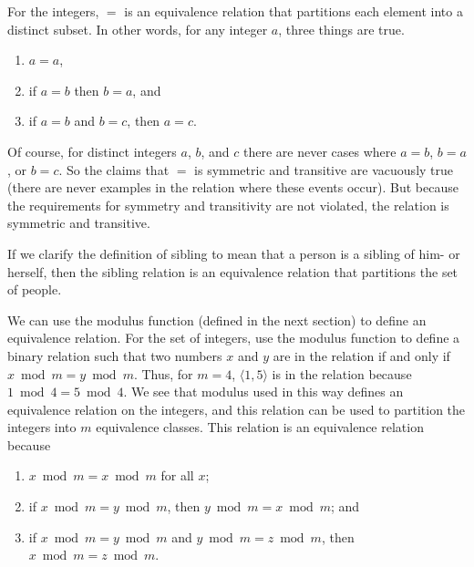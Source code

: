 \begin{example}
For the integers, \(=\) is an equivalence relation that partitions
each element into a distinct subset.
In other words, for any integer \(a\), three things are true.
\begin{enumerate}
\item \(a = a\),
\item if \(a = b\) then \(b = a\), and
\item if \(a = b\) and \(b = c\), then \(a = c\).
\end{enumerate}

Of course, for distinct integers \(a\), \(b\), and \(c\) there are
never cases where \(a = b\), \(b = a\), or \(b = c\).
So the claims that \(=\) is symmetric and transitive are vacuously
true (there are never examples in the relation where these events
occur).
But because the requirements for symmetry and transitivity are not
violated, the relation is symmetric and transitive.
\end{example}

\begin{example}
If we clarify the definition of sibling to mean that a person is
a sibling of him- or herself, then the sibling
relation is an equivalence relation that partitions the set of people.
\end{example}

\begin{example}
We can use the modulus function (defined in the next section) to
define an equivalence relation.
For the set of integers, use the modulus function 
to define a binary relation such that two numbers
\(x\) and \(y\) are in the relation if and only if
\(x \bmod m = y \bmod m\).
Thus, for \(m = 4\), \(\langle1, 5\rangle\) is in the relation because
\(1 \bmod 4 = 5 \bmod 4\).
We see that modulus used in this way defines an equivalence relation
on the integers, and this relation can be used to partition the
integers into \(m\) equivalence classes.
This relation is an equivalence relation because
\begin{enumerate}
\item \(x \bmod m = x \bmod m\) for all \(x\);
\item if \(x \bmod m = y \bmod m\), then \(y \bmod m = x \bmod m\); and 
\item if \(x \bmod m = y \bmod m\) and \(y \bmod m = z \bmod m\), then
	\(x \bmod m = z \bmod m\).
\end{enumerate}
\end{example}

